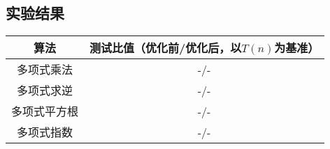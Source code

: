 \subsection{实验结果}

\begin{tabular}{c|c}
\hline
算法 & 测试比值（优化前/优化后，以$T(n)$为基准）\\
\hline
多项式乘法 & -/-\\
多项式求逆&-/-\\
多项式平方根&-/-\\
多项式指数&-/-\\
\hline
\end{tabular}
